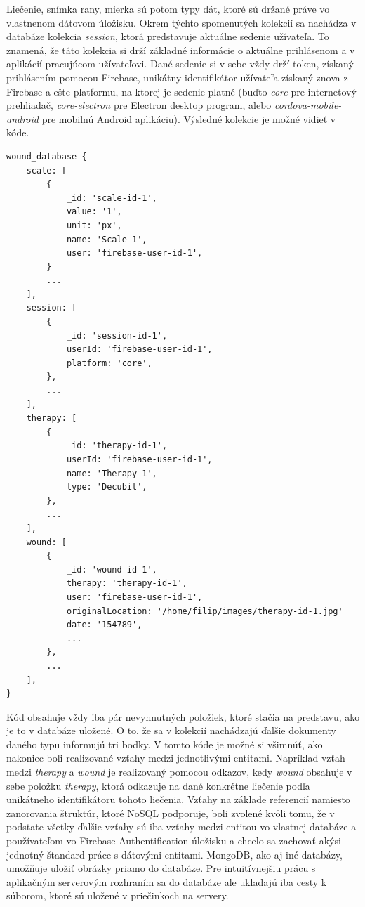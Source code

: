 Liečenie, snímka rany, mierka sú potom typy dát, ktoré sú držané práve vo vlastnenom dátovom úložisku. Okrem týchto spomenutých kolekcií sa nachádza v databáze kolekcia  \textit{session}, ktorá predstavuje aktuálne sedenie užívateľa. To znamená, že táto kolekcia si drží základné informácie o aktuálne prihlásenom a v aplikácií pracujúcom užívateľovi. Dané sedenie si v sebe vždy drží token, získaný prihlásením pomocou Firebase, unikátny identifikátor užívateľa získaný znova z Firebase a ešte platformu, na ktorej je sedenie platné (buďto  \textit{core} pre internetový prehliadač,  \textit{core-electron} pre Electron desktop program, alebo  \textit{cordova-mobile-android} pre mobilnú Android aplikáciu). Výsledné kolekcie je možné vidieť v kóde.
\begin{lstlisting}[caption={Finálna štruktúra databáze},captionpos=b]
wound_database {
    scale: [
        {
            _id: 'scale-id-1',
            value: '1',
            unit: 'px',
            name: 'Scale 1',
            user: 'firebase-user-id-1',
        }
        ...
    ],
    session: [
        {
            _id: 'session-id-1',
            userId: 'firebase-user-id-1',
            platform: 'core',
        },
        ...
    ],
    therapy: [
        {
            _id: 'therapy-id-1',
            userId: 'firebase-user-id-1',
            name: 'Therapy 1',
            type: 'Decubit',
        },
        ...
    ],
    wound: [
        {
            _id: 'wound-id-1',
            therapy: 'therapy-id-1',
            user: 'firebase-user-id-1',
            originalLocation: '/home/filip/images/therapy-id-1.jpg'
            date: '154789',
            ...
        },
        ...
    ],
}
\end{lstlisting}
Kód obsahuje vždy iba pár nevyhnutných položiek, ktoré stačia na predstavu, ako je to v databáze uložené. O to, že sa v kolekcií nachádzajú ďalšie dokumenty daného typu informujú tri bodky. V tomto kóde je možné si všimnúť, ako nakoniec boli realizované vzťahy medzi jednotlivými entitami. Napríklad vzťah medzi  \textit{therapy} a  \textit{wound} je realizovaný pomocou odkazov, kedy  \textit{wound} obsahuje v sebe položku  \textit{therapy}, ktorá odkazuje na dané konkrétne liečenie podľa unikátneho identifikátoru tohoto liečenia. Vzťahy na základe referencií namiesto zanorovania štruktúr, ktoré NoSQL podporuje, boli zvolené kvôli tomu, že v podstate všetky ďalšie vzťahy sú iba vzťahy medzi entitou vo vlastnej databáze a používateľom vo Firebase Authentification úložisku a chcelo sa zachovať akýsi jednotný štandard práce s dátovými entitami.  MongoDB, ako aj iné databázy, umožňuje uložiť obrázky priamo do databáze. Pre intuitívnejšiu prácu s aplikačným serverovým rozhraním sa do databáze ale ukladajú iba cesty k súborom, ktoré sú uložené v priečinkoch na servery.

